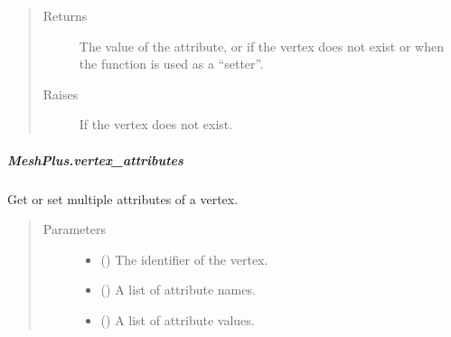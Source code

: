 \documentclass[letterpaper,10pt,english]{sphinxmanual}
\begin{document}
\begin{fulllineitems}
\begin{fulllineitems}
\begin{quote}
\begin{description}
\begin{itemize}
\end{itemize}

\item[{Returns}] \leavevmode
{} \textendash{} The value of the attribute,
or  if the vertex does not exist
or when the function is used as a “setter”.

\item[{Raises}] \leavevmode
{} \textendash{} If the vertex does not exist.

\end{description}\end{quote}

\end{fulllineitems}



\subparagraph{MeshPlus.vertex\_attributes}
\label{\detokenize{api/generated/directional_clustering.mesh.MeshPlus.vertex_attributes:meshplus-vertex-attributes}}\label{\detokenize{api/generated/directional_clustering.mesh.MeshPlus.vertex_attributes::doc}}

\begin{fulllineitems}
\label{\detokenize{api/generated/directional_clustering.mesh.MeshPlus.vertex_attributes:directional_clustering.mesh.MeshPlus.vertex_attributes}}
Get or set multiple attributes of a vertex.
\begin{quote}\begin{description}
\item[{Parameters}] \leavevmode\begin{itemize}
\item {} 
 () \textendash{} The identifier of the vertex.

\item {} 
 () \textendash{} A list of attribute names.

\item {} 
 () \textendash{} A list of attribute values.


\end{itemize}
\end{description}
\end{quote}
\end{fulllineitems}
\end{fulllineitems}
\end{document}

